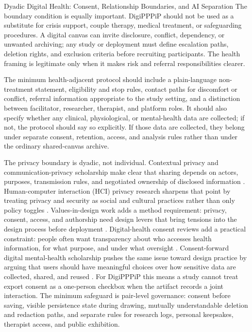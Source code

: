 \documentclass[
  ignorenonframetext,
]{beamer}
\begin{document}
\begin{frame}[allowframebreaks]{Dyadic Digital Health: Consent,
Relationship Boundaries, and AI Separation}
The boundary condition is equally important. DigiPPPiP should not be
used as a substitute for crisis support, couple therapy, medical
treatment, or safeguarding procedures. A digital canvas can invite
disclosure, conflict, dependency, or unwanted archiving; any study or
deployment must define escalation paths, deletion rights, and exclusion
criteria before recruiting participants. The health framing is
legitimate only when it makes risk and referral responsibilities
clearer.

The minimum health-adjacent protocol should include a plain-language
non-treatment statement, eligibility and stop rules, contact paths for
discomfort or conflict, referral information appropriate to the study
setting, and a distinction between facilitator, researcher, therapist,
and platform roles. It should also specify whether any clinical,
physiological, or mental-health data are collected; if not, the protocol
should say so explicitly. If those data are collected, they belong under
separate consent, retention, access, and analysis rules rather than
under the ordinary shared-canvas archive.

The privacy boundary is dyadic, not individual. Contextual privacy and
communication-privacy scholarship make clear that sharing depends on
actors, purposes, transmission rules, and negotiated ownership of
disclosed information . Human-computer interaction (HCI) privacy research
sharpens that point by treating privacy and security as social and
cultural practices rather than only policy toggles
. Values-in-design work adds a method
requirement: privacy, consent, access, and authorship need design levers
that bring tensions into the design process before deployment
. Digital-health consent reviews add a practical
constraint: people often want transparency about who accesses health
information, for what purpose, and under what oversight
. Consent-forward digital mental-health
scholarship pushes the same issue toward design practice by arguing that
users should have meaningful choices over how sensitive data are
collected, shared, and reused . For
DigiPPPiP this means a study cannot treat export consent as a one-person
checkbox when the artifact records a joint interaction. The minimum
safeguard is pair-level governance: consent before saving, visible
persistence state during drawing, mutually understandable deletion and
redaction paths, and separate rules for research logs, personal
keepsakes, therapist access, and public exhibition.


\end{frame}
\end{document}
